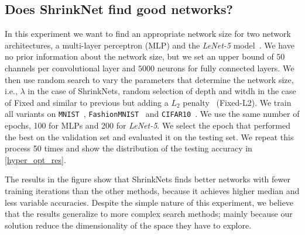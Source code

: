 \documentclass[sigconf]{acmart}
\begin{document}
\subsection{Does ShrinkNet find good networks?}

In this experiment we want to find an appropriate network size for two network
architectures, a multi-layer perceptron (MLP) and the \textit{LeNet-5}
model~\cite{Lecun1998}. We have no prior information about the network size, but
we set an upper bound of $50$ channels per convolutional layer and $5000$
neurons for fully connected layers. We then use random search to vary the
parameters that determine the network size, i.e., $\lambda$ in the case of
ShrinkNets, random selection of depth and witdh in the case of \textsf{Fixed}
and similar to previous but adding a $L_2$ penalty~\cite{Ng2004}
(\textsf{Fixed-L2}).  We train all variants on \texttt{MNIST}~\cite{Lecun1998},
\texttt{FashionMNIST}~\cite{Xiao2017} and
\texttt{CIFAR10}~\cite{Krizhevsky2009}. We use the same number of epochs, 100
for MLPs and 200 for \textit{LeNet-5}. We select the epoch that performed the
best on the validation set and evaluated it on the testing set. We repeat this
process 50 times and show the distribution of the testing accuracy in
\autoref{hyper_opt_res}.

The results in the figure show that ShrinkNets finds better networks with fewer
training iterations than the other methods, because it achieves higher median 
and less variable accuracies. Despite the simple nature of this experiment, we
believe that the results generalize to more complex search methods; mainly
because our solution reduce the dimensionality of the space they have to
explore.

%
\end{document}
